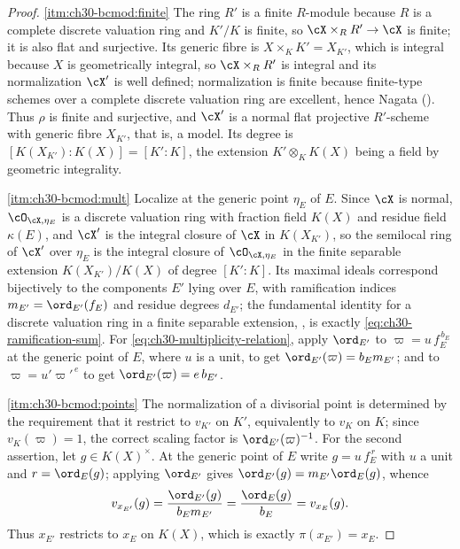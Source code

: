 \begin{proof}
\cref{itm:ch30-bcmod:finite}  The ring \(R'\) is a finite \(R\)-module
because \(R\) is a complete discrete valuation ring and \(K'/K\) is finite,
so \(\cX\times_RR'\to\cX\) is finite; it is also flat and surjective.  Its
generic fibre is \(X\times_KK'=X_{K'}\), which is integral because \(X\) is
geometrically integral, so \(\cX\times_RR'\) is integral and its
normalization \(\cX'\) is well defined; normalization is finite because
finite-type schemes over a complete discrete valuation ring are excellent,
hence Nagata (\cite[Tag 035S]{stacks-project}).  Thus \(\rho\) is finite and
surjective, and \(\cX'\) is a normal flat projective \(R'\)-scheme with
generic fibre \(X_{K'}\), that is, a model.  Its degree is
\([K(X_{K'}):K(X)]=[K':K]\), the extension \(K'\otimes_KK(X)\) being a field
by geometric integrality.

\cref{itm:ch30-bcmod:mult}  Localize at the generic point \(\eta_E\) of
\(E\).  Since \(\cX\) is normal, \(\cO_{\cX,\eta_E}\) is a discrete
valuation ring with fraction field \(K(X)\) and residue field
\(\kappa(E)\), and \(\cX'\) is the integral closure of \(\cX\) in
\(K(X_{K'})\), so the semilocal ring of \(\cX'\) over \(\eta_E\) is the
integral closure of \(\cO_{\cX,\eta_E}\) in the finite separable extension
\(K(X_{K'})/K(X)\) of degree \([K':K]\).  Its maximal ideals correspond
bijectively to the components \(E'\) lying over \(E\), with ramification
indices \(m_{E'}=\ord_{E'}(f_E)\) and residue degrees \(d_{E'}\); the
fundamental identity for a discrete valuation ring in a finite separable
extension, \cite[Ch.~VI]{ZariskiSamuelII}, is exactly
\eqref{eq:ch30-ramification-sum}.  For
\eqref{eq:ch30-multiplicity-relation}, apply \(\ord_{E'}\) to
\(\varpi=u\,f_E^{\,b_E}\) at the generic point of \(E\), where \(u\) is a
unit, to get \(\ord_{E'}(\varpi)=b_Em_{E'}\); and to
\(\varpi=u'\varpi'^{\,e}\) to get \(\ord_{E'}(\varpi)=e\,b_{E'}\).

\cref{itm:ch30-bcmod:points}  The normalization of a divisorial point is
determined by the requirement that it restrict to \(v_{K'}\) on \(K'\),
equivalently to \(v_K\) on \(K\); since \(v_K(\varpi)=1\), the correct
scaling factor is \(\ord_{E'}(\varpi)^{-1}\).  For the second assertion,
let \(g\in K(X)^\times\).  At the generic point of \(E\) write
\(g=u\,f_E^{\,r}\) with \(u\) a unit and \(r=\ord_E(g)\); applying
\(\ord_{E'}\) gives \(\ord_{E'}(g)=m_{E'}\ord_E(g)\), whence
\[
 v_{x_{E'}}(g)=\frac{\ord_{E'}(g)}{b_Em_{E'}}
              =\frac{\ord_E(g)}{b_E}=v_{x_E}(g).
\]
Thus \(x_{E'}\) restricts to \(x_E\) on \(K(X)\), which is exactly
\(\pi(x_{E'})=x_E\).


\end{proof}
